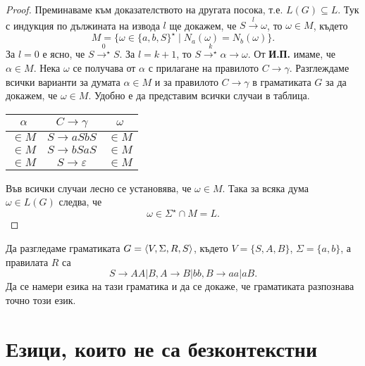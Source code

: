 \begin{proof}
  Преминаваме към доказателството на другата посока, т.е. $L(G) \subseteq L$.
  Тук с индукция по дължината на извода $l$ ще докажем, че
  $S \stackrel{l}{\rightarrow} \omega$, то $\omega \in M$,
  където
  \[M = \{\omega \in \{a,b,S\}^\star \mid N_a(\omega) = N_b(\omega)\}.\]
  За $l = 0$  е ясно, че $S \stackrel{0}{\rightarrow^\star} S$.
  За $l = k+1$, то $S \stackrel{k}{\rightarrow^\star} \alpha \rightarrow \omega$.
  От {\bf И.П.} имаме, че $\alpha \in M$.
  Нека $\omega$ се получава от $\alpha$ с прилагане на правилото $C \rightarrow \gamma$.
  Разглеждаме всички варианти за думата $\alpha \in M$ и за правилото $C\rightarrow \gamma$ в граматиката $G$
  за да докажем, че  $\omega \in M$.
  Удобно е да представим всички случаи в таблица.
  \begin{center}
    \begin{tabular}{| c | c | c |}
      \hline
      $\alpha$ & $C \rightarrow \gamma$ & $\omega$ \\ \hline
      $\in M$ & $S \rightarrow aSbS$ & $\in M$ \\ \hline
      $\in M$ & $S \rightarrow bSaS$ & $\in M$ \\ \hline
      $\in M$ & $S \rightarrow \varepsilon$ & $\in M$ \\ \hline
    \end{tabular}
  \end{center}
  Във всички случаи лесно се установява, че $\omega \in M$.
  Така за всяка дума $\omega \in L(G)$ следва, че
  \[\omega \in \Sigma^\star \cap M = L.\]
\end{proof}

\begin{problem}
  Да разгледаме граматиката $G = \langle{V,\Sigma,R,S}\rangle$, където  $V = \{S,A,B\}$, $\Sigma = \{a,b\}$, а правилата $R$ са
  \[S \to AA | B, A \to B | bb, B \to aa | aB.\]
  Да се намери езика на тази граматика и да се докаже, че граматиката разпознава точно този език.
\end{problem}

\section{Езици, които не са безконтекстни}

